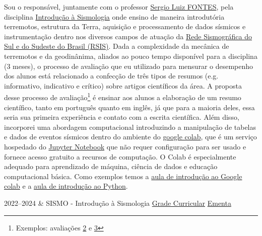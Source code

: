 \documentclass[10pt,a4paper,oneside]{book}
\begin{document}
Sou o responsável, juntamente com o professor \href{http://lattes.cnpq.br/8537150955145617}{Sergio Luiz FONTES}, pela disciplina \href{https://www.gov.br/observatorio/pt-br/assuntos/programas-academicos/pos-graduacao-em-geofisica/ementas/introducao-a-sismologia}{Introdução à Sismologia} onde ensino de maneira introdutória terremotos, estrutura da Terra, aquisição e processamento de dados sísmicos e instrumentação dentro nos diversos campos de atuação da \href{http://www.rsis.on.br/}{Rede Sismográfica do Sul e do Sudeste do Brasil (RSIS)}. Dada a complexidade da mecânica de terremotos e da geodinânima, aliados ao pouco tempo disponível para a disciplina (3 meses), o processo de avaliação que eu utilizado para mensurar o desempenho dos alunos está relacionado a confecção de três tipos de resumos (e.g. informativo, indicativo e crítico) sobre artigos científicos da área. A proposta desse processo de avaliação\footnote{Exemplos: avaliações \href{https://docs.google.com/forms/d/e/1FAIpQLSffa78ttrM_i5cWZmISGNz-lhwShi3Wzk7AUbWPgN6lhDuTNQ/viewform}{2} e \href{https://docs.google.com/forms/d/e/1FAIpQLSe8FIH4vSjn5QLT79BdG8eVRLti0le8i6yssInmQTX1iXNrYA/viewform}{3}} é ensinar aos alunos a elaboração de um resumo científico, tanto em português quanto em inglês, já que para a maioria deles, essa seria sua primeira experiência e contato com a escrita científica. Além disso, incorporei uma abordagem computacional introduzindo a manipulação de tabelas e dados de eventos sísmicos dentro do ambiente do \href{https://colab.google/}{google colab}, que é um serviço hospedado do \href{https://jupyter.org/}{Jupyter Notebook} que não requer configuração para ser usado e fornece acesso gratuito a recursos de computação. O Colab é especialmente adequado para aprendizado de máquina, ciência de dados e educação computacional básica. Como exemplos temos a \href{https://colab.research.google.com/drive/1c7Vc_s0A5GURJIab2vTS-LCW8fPlRaXt?usp=sharing}{aula de introdução ao Google colab} e a \href{https://colab.research.google.com/drive/17VaW0MkQxcxUjGaeowaVwyRORrijCXaV?usp=sharing}{aula de introdução ao Python}.

\bigskip

\begin{subsummarybox}[frametitle=\faGraduationCap{}\quad Disciplinas ministradas no Observatório Nacional]
  \begin{courselist}
    2022--2024 &
      SISMO - Introdução à Sismologia
      \newline
      \faInfoCircle \href{https://www.gov.br/observatorio/pt-br/assuntos/programas-academicos/pos-graduacao-em-geofisica/grade-curricular}{Grade Curricular}
      \newline
      \faInbox \href{https://www.gov.br/observatorio/pt-br/assuntos/programas-academicos/pos-graduacao-em-geofisica/ementas/introducao-a-sismologia}{Ementa}
  \end{courselist}
\end{subsummarybox}
\end{document}
